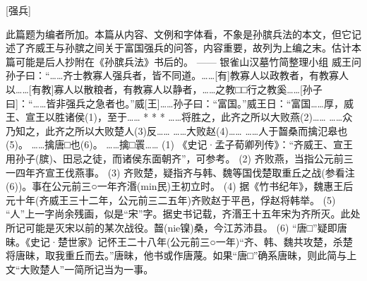 \documentclass[12pt,UTF8]{ctexbook}
\begin{document}
[强兵]

此篇题为编者所加。本篇从内容、文例和字体看，不象是孙膑兵法的本文，但它记述了齐威王与孙膑之间关于富国强兵的问答，内容重要，故列为上编之末。估计本篇可能是后人抄附在《孙膑兵法》书后的。
—— 银雀山汉墓竹简整理小组
威王问孙子曰：“……齐士教寡人强兵者，皆不同道。……[有]教寡人以政教者，有教寡人以……[有教]寡人以散粮者，有教寡人以静者，……之教□□行之教奚……[孙子曰]：“……皆非强兵之急者也。”威[王]……孙子曰：“富国。”威王日：“富国……厚，威王、宣王以胜诸侯(1)，至于……
* * *
……将胜之，此齐之所以大败燕(2)……
……众乃知之，此齐之所以大败楚人(3)反……
……大败赵(4)……
……人于齧桑而擒氾皋也(5)。
……擒唐□也(6)。
……擒□瞏……
(1) 《史记·孟子荀卿列传》：“齐威王、宣王用孙子(膑)、田忌之徒，而诸侯东面朝齐”，可参考。
(2) 齐败燕，当指公元前三一四年齐宣王伐燕事。
(3) 齐败楚，疑指齐与韩、魏等国伐楚取重丘之战(参看注(6))。事在公元前三○一年齐湣(min民)王初立时。
(4) 据《竹书纪年》，魏惠王后元十年(齐威王三十二年，公元前三二五年)齐败赵于平邑，俘赵将韩举。
(5) “人”上一字尚余残画，似是“宋”字。据史书记载，齐湣王十五年宋为齐所灭。此处所记可能是灭宋以前的某次战役。齧(nie镍)桑，今江苏沛县。
(6) “唐□”疑即唐昧。《史记·楚世家》记怀王二十八年(公元前三○一年)“齐、韩、魏共攻楚，杀楚将唐昧，取我重丘而去。”唐昧，他书或作唐蔑。如果“唐□”确系唐昧，则此简与上文“大败楚人”一简所记当为一事。
\end{document}
